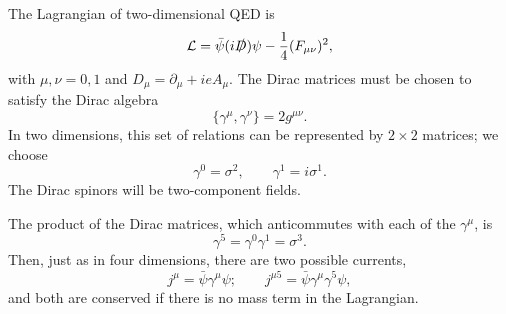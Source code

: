 The Lagrangian of two-dimensional QED is
\begin{equation}
  \mathcal{L} = \bar{\psi}(i\slashed{D})\psi - \frac{1}{4}(F_{\mu\nu})^2 ,
  \label{eq:19.2}
\end{equation}
with $\mu, \nu = 0, 1$ and $D_\mu = \partial_\mu + ieA_\mu$.  The Dirac matrices
must be chosen to satisfy the Dirac algebra
\begin{equation}
  \{\gamma^\mu, \gamma^\nu\} = 2g^{\mu\nu} .
  \label{eq:19.3}
\end{equation}
In two dimensions, this set of relations can be represented by $2\times2$
matrices; we choose
\begin{equation}
  \gamma^0 = \sigma^2,\qquad \gamma^1 = i\sigma^1 .
  \label{eq:19.4}
\end{equation}
The Dirac spinors will be two-component fields.

The product of the Dirac matrices, which anticommutes with each of the
$\gamma^\mu$, is
\begin{equation}
  \gamma^5 = \gamma^0\gamma^1 = \sigma^3 .
  \label{eq:19.5}
\end{equation}
Then, just as in four dimensions, there are two possible currents,
\begin{equation}
  j^\mu = \bar{\psi}\gamma^\mu\psi;\qquad j^{\mu 5} = \bar{\psi}\gamma^\mu
    \gamma^5\psi ,
  \label{eq:19.6}
\end{equation}
and both are conserved if there is no mass term in the Lagrangian.

